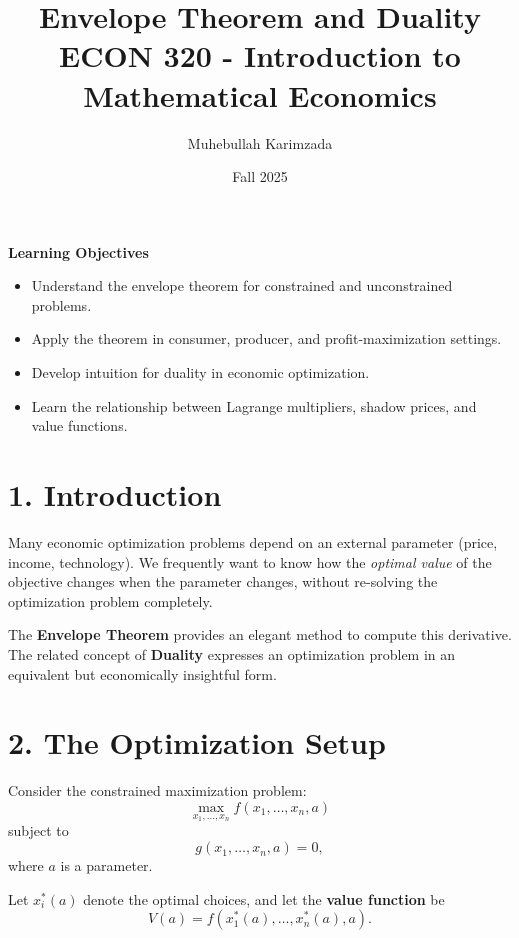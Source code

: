 \documentclass[12pt]{article}
\title{\textbf{Envelope Theorem and Duality}\\[7pt]
\large ECON 320 - Introduction to Mathematical Economics}
\author{Muhebullah Karimzada}
\date{Fall 2025}
\begin{document}
\maketitle



\vspace{1em}

\begin{tcolorbox}
\textbf{Learning Objectives}
\begin{itemize}
\item Understand the envelope theorem for constrained and unconstrained problems.
\item Apply the theorem in consumer, producer, and profit-maximization settings.
\item Develop intuition for duality in economic optimization.
\item Learn the relationship between Lagrange multipliers, shadow prices, and value functions.
\end{itemize}
\end{tcolorbox}

\section*{1. Introduction}

Many economic optimization problems depend on an external parameter (price, income, technology). 
We frequently want to know how the \textit{optimal value} of the objective changes when the parameter changes, without re-solving the optimization problem completely.

The \textbf{Envelope Theorem} provides an elegant method to compute this derivative.  
The related concept of \textbf{Duality} expresses an optimization problem in an equivalent but economically insightful form.

\section*{2. The Optimization Setup}

Consider the constrained maximization problem:
\[
\max_{x_1,\ldots,x_n} f(x_1,\ldots,x_n,a)
\]
subject to
\[
g(x_1,\ldots,x_n,a)=0,
\]
where $a$ is a parameter.

Let $x_i^*(a)$ denote the optimal choices, and let the \textbf{value function} be
\[
V(a)=f(x_1^*(a), \ldots, x_n^*(a), a).
\]
\end{document}
